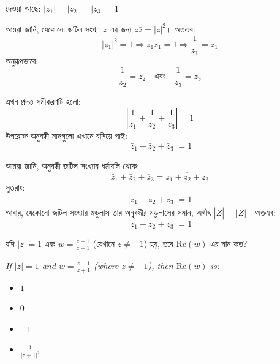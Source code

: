 \documentclass[12pt, a4paper]{article}
\begin{document}
\begin{tcolorbox}[solutionbox={সমাধান (Solution)}]
    \noindent
    দেওয়া আছে: $|z_1| = |z_2| = |z_3| = 1$
    
    \vspace{0.5em}
    আমরা জানি, যেকোনো জটিল সংখ্যা $z$ এর জন্য $z \bar{z} = |z|^2$। অতএব:
    \[ |z_1|^2 = 1 \Rightarrow z_1 \bar{z}_1 = 1 \Rightarrow \frac{1}{z_1} = \bar{z}_1 \]
    অনুরূপভাবে:
    \[ \frac{1}{z_2} = \bar{z}_2 \quad \text{এবং} \quad \frac{1}{z_3} = \bar{z}_3 \]
    
    \vspace{0.5em}
    এখন প্রদত্ত সমীকরণটি হলো:
    \[ \left|\frac{1}{z_1} + \frac{1}{z_2} + \frac{1}{z_3}\right| = 1 \]
    উপরোক্ত অনুবন্ধী মানগুলো এখানে বসিয়ে পাই:
    \[ \left|\bar{z}_1 + \bar{z}_2 + \bar{z}_3\right| = 1 \]
    
    \vspace{0.5em}
    আমরা জানি, অনুবন্ধী জটিল সংখ্যার ধর্মাবলি থেকে:
    \[ \bar{z}_1 + \bar{z}_2 + \bar{z}_3 = \overline{z_1 + z_2 + z_3} \]
    সুতরাং:
    \[ \left|\overline{z_1 + z_2 + z_3}\right| = 1 \]
    আবার, যেকোনো জটিল সংখ্যার মডুলাস তার অনুবন্ধীর মডুলাসের সমান, অর্থাৎ $|\bar{Z}| = |Z|$। অতএব:
    \[ |z_1 + z_2 + z_3| = 1 \]
\end{tcolorbox}
\vspace{1em}

\begin{tcolorbox}[questionbox={প্রশ্ন (Question) 11}]
    \noindent
    যদি $|z| = 1$ এবং $w = \frac{z-1}{z+1}$ (যেখানে $z \neq -1$) হয়, তবে $\text{Re}(w)$ এর মান কত?
    
    \vspace{0.8em}
    \begin{english}
    \noindent\textit{\color{darkgray}
    If $|z| = 1$ and $w = \frac{z-1}{z+1}$ (where $z \neq -1$), then $\text{Re}(w)$ is:
    }
    \end{english}
\end{tcolorbox}

\begin{itemize}[label={}, leftmargin=1cm, itemsep=0.5em]
    \item[\textbf{A)}] $1$
    \item[\textbf{B)}] $0$
    \item[\textbf{C)}] $-1$
    \item[\textbf{D)}] $\frac{1}{|z+1|^2}$
\end{itemize}
\end{document}
